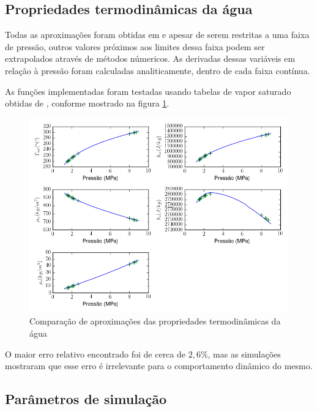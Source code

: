 \subsection{Propriedades termodinâmicas da água}
Todas as aproximações foram obtidas em  e apesar
de serem restritas a uma faixa de pressão, outros valores próximos aos
limites dessa faixa podem ser extrapolados através de métodos
númericos. As derivadas dessas variáveis em relação à pressão foram
calculadas analiticamente, dentro de cada faixa contínua.

As funções implementadas foram testadas usando tabelas de vapor
saturado obtidas de , conforme mostrado na figura
\ref{plots_steam_tables}.

\begin{figure}[H]
\caption{\label{plots_steam_tables} Comparação de aproximações das
  propriedades termodinâmicas da água}
\begin{center}
\includegraphics[scale=0.7]{img/steam_table_plots.png}
\end{center}
\end{figure}

O maior erro relativo encontrado foi de cerca de $2,6\%$, mas as
simulações mostraram que esse erro é irrelevante para o comportamento
dinâmico do mesmo.


\subsection{Parâmetros de simulação}

